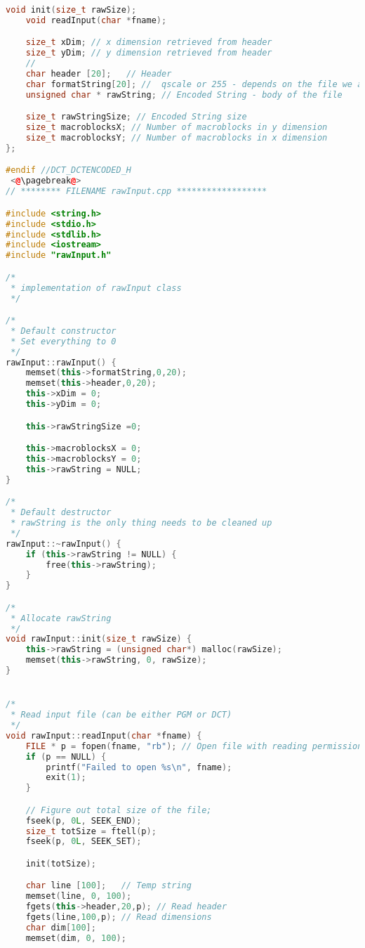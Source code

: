 \documentclass{report}
\begin{document}
\begin{lstlisting}[language=C++]
    void init(size_t rawSize);
    void readInput(char *fname);

    size_t xDim; // x dimension retrieved from header
    size_t yDim; // y dimension retrieved from header
    //
    char header [20];   // Header
    char formatString[20]; //  qscale or 255 - depends on the file we are reading
    unsigned char * rawString; // Encoded String - body of the file

    size_t rawStringSize; // Encoded String size
    size_t macroblocksX; // Number of macroblocks in y dimension
    size_t macroblocksY; // Number of macroblocks in x dimension
};

#endif //DCT_DCTENCODED_H
 <@\pagebreak@>
// ******** FILENAME rawInput.cpp ******************

#include <string.h>
#include <stdio.h>
#include <stdlib.h>
#include <iostream>
#include "rawInput.h"

/*
 * implementation of rawInput class
 */

/*
 * Default constructor
 * Set everything to 0
 */
rawInput::rawInput() {
    memset(this->formatString,0,20);
    memset(this->header,0,20);
    this->xDim = 0;
    this->yDim = 0;

    this->rawStringSize =0;

    this->macroblocksX = 0;
    this->macroblocksY = 0;
    this->rawString = NULL;
}

/*
 * Default destructor
 * rawString is the only thing needs to be cleaned up
 */
rawInput::~rawInput() {
    if (this->rawString != NULL) {
        free(this->rawString);
    }
}

/*
 * Allocate rawString
 */
void rawInput::init(size_t rawSize) {
    this->rawString = (unsigned char*) malloc(rawSize);
    memset(this->rawString, 0, rawSize);
}


/*
 * Read input file (can be either PGM or DCT)
 */
void rawInput::readInput(char *fname) {
    FILE * p = fopen(fname, "rb"); // Open file with reading permission
    if (p == NULL) {
        printf("Failed to open %s\n", fname);
        exit(1);
    }

    // Figure out total size of the file;
    fseek(p, 0L, SEEK_END);
    size_t totSize = ftell(p);
    fseek(p, 0L, SEEK_SET);

    init(totSize);

    char line [100];   // Temp string
    memset(line, 0, 100);
    fgets(this->header,20,p); // Read header
    fgets(line,100,p); // Read dimensions
    char dim[100];
    memset(dim, 0, 100);


\end{lstlisting}
\end{document}
